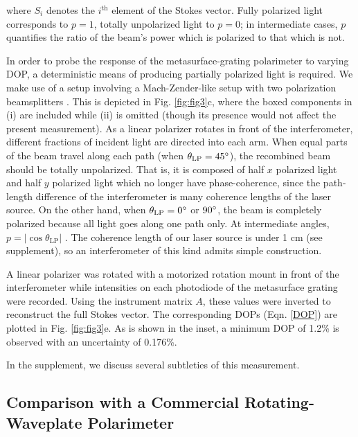 \documentclass[footinbib,aps,prl,twocolumn,superscriptaddress]{revtex4-1}
\begin{document}
where $S_i$ denotes the $i^{\text{th}}$ element of the Stokes vector. Fully polarized light corresponds to $p=1$, totally unpolarized light to $p=0$; in intermediate cases, $p$ quantifies the ratio of the beam's power which is polarized to that which is not.

In order to probe the response of the metasurface-grating polarimeter to varying DOP, a deterministic means of producing partially polarized light is required. We make use of a setup involving a Mach-Zender-like setup with two polarization beamsplitters \cite{Lizana2015, Damask2005}. This is depicted in Fig. \ref{fig:fig3}c, where the boxed components in (i) are included while (ii) is omitted (though its presence would not affect the present measurement). As a linear polarizer rotates in front of the interferometer, different fractions of incident light are directed into each arm. When equal parts of the beam travel along each path (when $\theta_{\text{LP}} = 45\degree$), the recombined beam should be totally unpolarized. That is, it is composed of half $x$ polarized light and half $y$ polarized light which no longer have phase-coherence, since the path-length difference of the interferometer is many coherence lengths of the laser source. On the other hand, when $\theta_{\text{LP}} = 0\degree$ or $90\degree$, the beam is completely polarized because all light goes along one path only. At intermediate angles, $p = \lvert \cos \theta_{\text{LP}} \rvert$ \cite{Lizana2015}. The coherence length of our laser source is under 1 cm (see supplement), so an interferometer of this kind admits simple construction.

A linear polarizer was rotated with a motorized rotation mount in front of the interferometer while intensities on each photodiode of the metasurface grating were recorded. Using the instrument matrix $A$, these values were inverted  to reconstruct the full Stokes vector. The corresponding DOPs (Eqn. \ref{DOP}) are plotted in Fig. \ref{fig:fig3}e. As is shown in the inset, a minimum DOP of 1.2\% is observed with an uncertainty of 0.176\%.

In the supplement, we discuss several subtleties of this measurement.

\subsection{Comparison with a Commercial Rotating-Waveplate Polarimeter}
\end{document}

